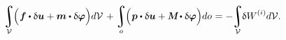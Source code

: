\nopagebreak\vspace{-0.1em}\begin{equation*}
\integral\displaylimits_{\mathcal{V}} \hspace{-0.64ex} \left(^{\mathstrut} \bm{f} \dotp \variation{\fieldofdisplacements} + \bm{m} \dotp \variation{\fieldofrotations} \right) \hspace{-0.4ex} d\mathcal{V}
\hspace{.25ex} +
\integral\displaylimits_o \hspace{-0.64ex} \left(^{\mathstrut} \bm{p} \dotp \variation{\fieldofdisplacements} + \mathboldM \hspace{-0.1ex} \dotp \variation{\fieldofrotations} \right) \hspace{-0.4ex} do \hspace{.12ex}
= - \hspace{-0.5ex} \integral\displaylimits_{\mathcal{V}} \hspace{-0.64ex} \variation{\internalwork} \hspace{.1ex} d\mathcal{V} .
\end{equation*}

